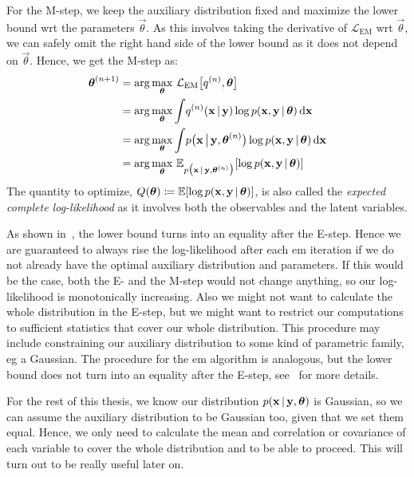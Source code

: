 	For the M-step, we keep the auxiliary distribution fixed and maximize the lower bound \ac{wrt} the parameters \(\vec{\theta}\). As this involves taking the derivative of \(\mathcal{L}_\mathrm{EM}\) \ac{wrt} \(\vec{\theta}\), we can safely omit the right hand side of the lower bound as it does not depend on \(\vec{\theta}\). Hence, we get the M-step as:
	\begin{align*}
		\boldsymbol{\mathrm{\theta}}^{(n + 1)}
			&= \arg\max_{\boldsymbol{\mathrm{\theta}}}\, \mathcal{L}_\mathrm{EM}\big[ q^{(n)}, \boldsymbol{\mathrm{\theta}} \big] \\
			&= \arg\max_{\boldsymbol{\mathrm{\theta}}} \int\! q^{(n)}(\boldsymbol{\mathrm{x}} \,\vert\, \boldsymbol{\mathrm{y}}) \log p(\boldsymbol{\mathrm{x}}, \boldsymbol{\mathrm{y}} \,\vert\, \boldsymbol{\mathrm{\theta}}) \dd{\boldsymbol{\mathrm{x}}} \\
			&= \arg\max_{\boldsymbol{\mathrm{\theta}}} \int\! p\big(\boldsymbol{\mathrm{x}} \,\big\vert\, \boldsymbol{\mathrm{y}}, \boldsymbol{\mathrm{\theta}}^{(n)}\big) \log p(\boldsymbol{\mathrm{x}}, \boldsymbol{\mathrm{y}} \,\vert\, \boldsymbol{\mathrm{\theta}}) \dd{\boldsymbol{\mathrm{x}}} \\
			&= \arg\max_{\boldsymbol{\mathrm{\theta}}}\, \mathbb{E}_{p\big(\boldsymbol{\mathrm{x}} \,\vert\, \boldsymbol{\mathrm{y}}, \boldsymbol{\mathrm{\theta}}^{(n)}\big)}[\log p(\boldsymbol{\mathrm{x}}, \boldsymbol{\mathrm{y}} \,\vert\, \boldsymbol{\mathrm{\theta}})]
	\end{align*}
	The quantity to optimize, \( Q(\boldsymbol{\mathrm{\theta}}) \coloneqq \mathbb{E}[\log p(\boldsymbol{\mathrm{x}}, \boldsymbol{\mathrm{y}} \,\vert\, \boldsymbol{\mathrm{\theta}})] \), is also called the \emph{expected complete log-likelihood} as it involves both the observables and the latent variables.

	As shown in~\cite{bealVariationalAlgorithmsApproximate2003}, the lower bound turns into an equality after the E-step. Hence we are guaranteed to always rise the log-likelihood after each \ac{em} iteration if we do not already have the optimal auxiliary distribution and parameters. If this would be the case, both the E- and the M-step would not change anything, so our log-likelihood is monotonically increasing. Also we might not want to calculate the whole distribution in the E-step, but we might want to restrict our computations to sufficient statistics that cover our whole distribution. This procedure may include constraining our auxiliary distribution to some kind of parametric family, \ac{eg} a Gaussian. The procedure for the \ac{em} algorithm is analogous, but the lower bound does not turn into an equality after the E-step, see~\cite[49-51]{bealVariationalAlgorithmsApproximate2003} for more details.

	For the rest of this thesis, we know our distribution \( p(\boldsymbol{\mathrm{x}} \,\vert\, \boldsymbol{\mathrm{y}}, \boldsymbol{\mathrm{\theta}}) \) is Gaussian, so we can assume the auxiliary distribution to be Gaussian too, given that we set them equal. Hence, we only need to calculate the mean and correlation or covariance of each variable to cover the whole distribution and to be able to proceed. This will turn out to be really useful later on.

